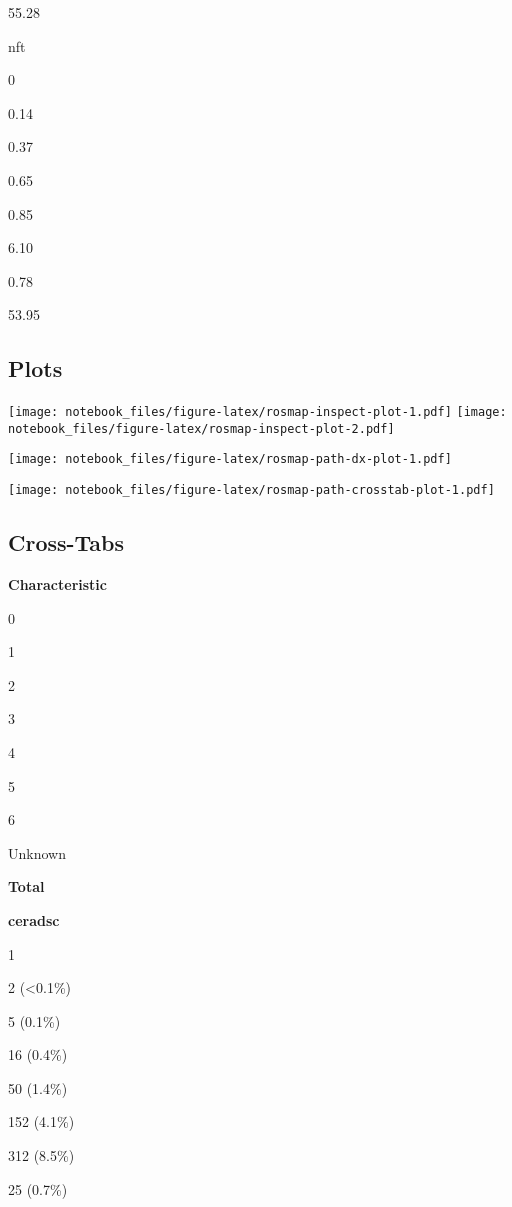 \documentclass[]{book}
\begin{document}
55.28

nft

0

0.14

0.37

0.65

0.85

6.10

0.78

53.95

\hypertarget{htmlwidget-4b6080d63955848b42f4}{}
\begin{datatables}

\end{datatables}

\hypertarget{plots-5}{%
\subsection{Plots}\label{plots-5}}

\texttt{[image: notebook\_files/figure-latex/rosmap-inspect-plot-1.pdf]} \texttt{[image: notebook\_files/figure-latex/rosmap-inspect-plot-2.pdf]}

\texttt{[image: notebook\_files/figure-latex/rosmap-path-dx-plot-1.pdf]}

\texttt{[image: notebook\_files/figure-latex/rosmap-path-crosstab-plot-1.pdf]}

\hypertarget{cross-tabs-1}{%
\subsection{Cross-Tabs}\label{cross-tabs-1}}

\textbf{Characteristic}

0

1

2

3

4

5

6

Unknown

\textbf{Total}

\textbf{ceradsc}

1

2 (\textless{}0.1\%)

5 (0.1\%)

16 (0.4\%)

50 (1.4\%)

152 (4.1\%)

312 (8.5\%)

25 (0.7\%)
\end{document}
